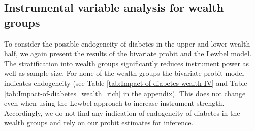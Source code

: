 \clearpage

\subsection*{Instrumental variable analysis for wealth groups}


To consider the possible endogeneity of diabetes in the upper and
lower wealth half, we again present the results of the bivariate probit
and the Lewbel model. The stratification into wealth groups significantly
reduces instrument power as well as sample size. For none of the wealth
groups the bivariate probit model indicates endogeneity (see Table
\ref{tab:Impact-of-diabetes-wealth-IV} and Table \ref{tab:Impact-of-diabetes_wealth_rich} in the appendix).
This does not change even when using the Lewbel approach to increase
instrument strength. Accordingly, we do not find any indication of
endogeneity of diabetes in the wealth groups and rely on our probit
estimates for inference.

